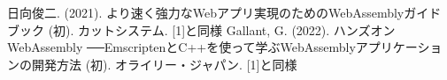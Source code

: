 \begin{thebibliography}{99}
\small
\setlength\itemsep{-0.5\zh}%
日向俊二. (2021). より速く強力なWebアプリ実現のためのWebAssemblyガイドブック (初). カットシステム.
[1]と同様
Gallant, G. (2022). ハンズオンWebAssembly ──EmscriptenとC++を使って学ぶWebAssemblyアプリケーションの開発方法 (初). オライリー・ジャパン.
[1]と同様
\end{thebibliography}

 
